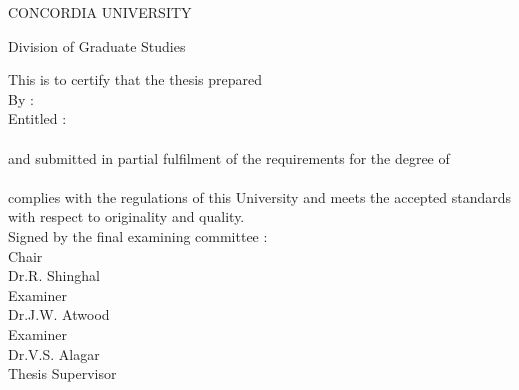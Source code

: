   \begin{titlepage}
     \vspace*{1ex}
     \begin{center}
        CONCORDIA UNIVERSITY
     \end{center}
     \begin{center}
        Division of Graduate Studies
     \end{center}
     \vspace{3ex}
     This is to certify that the thesis prepared\\[2ex]
     By :\hspace{40pt}{\bf Lawrence A. Hegarty}\\[2ex]
     Entitled :\hspace*{13pt}{\bf Implementing the Dee System:}\\ 
     \hspace*{62pt}{\bf Issues and Experiences} \\[2ex]
    and submitted in partial fulfilment of the requirements for the degree
    of\\[2ex]
    \hspace*{62pt}{\bf Master of Computer Science}\\[2ex]
    complies with the regulations of this University and meets the accepted
    standards with respect to originality and quality. \\[2ex]
    Signed by the final examining committee : \\[5ex]
    \hspace*{77pt}\underline{\hspace{234pt}} Chair\\
    \hspace*{77pt}Dr.\@ R. Shinghal\\[2.5ex]
    \hspace*{77pt}\underline{\hspace{234pt}} Examiner\\
    \hspace*{77pt}Dr.\@ J.W. Atwood\\[2.5ex]
    \hspace*{77pt}\underline{\hspace{234pt}} Examiner\\
    \hspace*{77pt}Dr.\@ V.S. Alagar\\[2.5ex]
    \hspace*{77pt}\underline{\hspace{234pt}} Thesis Supervisor \\

\end{titlepage}
